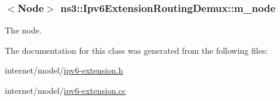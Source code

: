 \subsubsection[{\texorpdfstring{m\+\_\+node}{m_node}}]{$<${\bf Node}$>$ ns3\+::\+Ipv6\+Extension\+Routing\+Demux\+::m\+\_\+node\hspace{0.3cm}{\ttfamily [private]}}\hypertarget{classns3_1_1Ipv6ExtensionRoutingDemux_ad38f596db08784e26f953912bcaae9a7}{}\label{classns3_1_1Ipv6ExtensionRoutingDemux_ad38f596db08784e26f953912bcaae9a7}


The node. 



The documentation for this class was generated from the following files\+:\begin{DoxyCompactItemize}
\item 
internet/model/\hyperlink{ipv6-extension_8h}{ipv6-\/extension.\+h}\item 
internet/model/\hyperlink{ipv6-extension_8cc}{ipv6-\/extension.\+cc}\end{DoxyCompactItemize}
